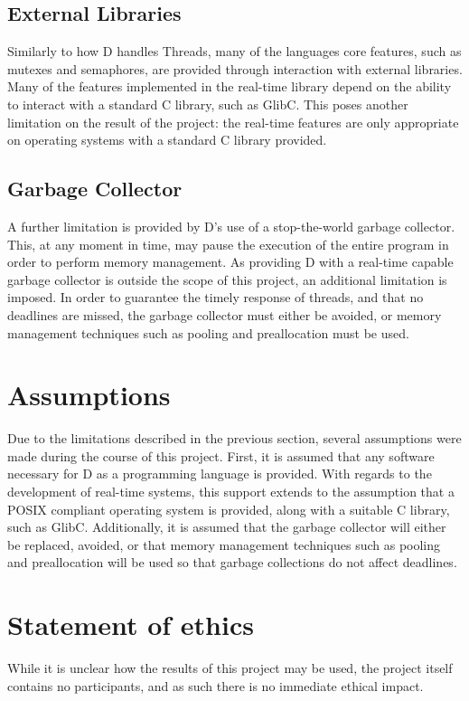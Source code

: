 \subsection{External Libraries}

Similarly to how D handles Threads, many of the languages core features, such as 
mutexes and semaphores, are provided through interaction with external libraries. 
Many of the features implemented in the real-time library depend on the ability 
to interact with a standard C library, such as GlibC. This poses another limitation 
on the result of the project: the real-time features are only appropriate on 
operating systems with a standard C library provided. 

\subsection{Garbage Collector}
A further limitation is provided by D's use of a stop-the-world garbage collector. 
This, at any moment in time, may pause the execution of the entire program in 
order to perform memory management. As providing D with a real-time capable 
garbage collector is outside the scope of this project, an additional limitation 
is imposed. In order to guarantee the timely response of threads, and that no 
deadlines are missed, the garbage collector must either be avoided, or memory 
management techniques such as pooling and preallocation must be used. 

\section{Assumptions} %
Due to the limitations described in the previous section, several assumptions were 
made during the course of this project. 
First, it is assumed that any software necessary for D as a programming language is 
provided. With regards to the development of real-time systems, this support  
extends to the assumption that a POSIX compliant operating system is provided, 
along with a suitable C library, such as GlibC. 
Additionally, it is assumed that the garbage collector will either be replaced, 
avoided, or that memory management techniques such as pooling and preallocation 
will be used so that garbage collections do not affect deadlines. 

\section{Statement of ethics}
While it is unclear how the results of this project may be used, the project 
itself contains no participants, and as such there is no immediate ethical impact.

